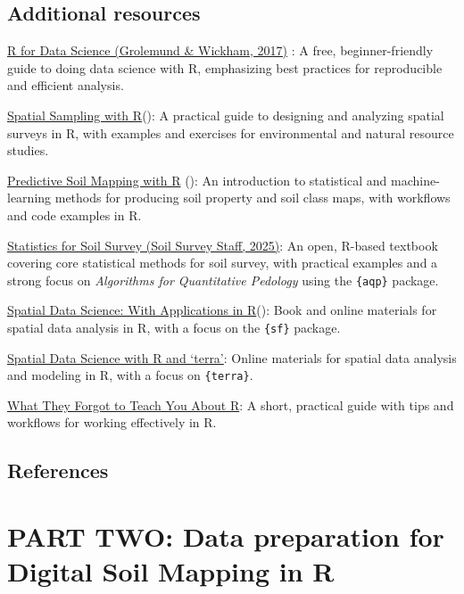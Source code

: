 \documentclass[
  10pt,
  b5paper,
  oneside]{book}
\begin{document}
\subsection{Additional resources}\label{r-resources}

\href{https://r4ds.had.co.nz/}{R for Data Science (Grolemund \& Wickham, 2017)} : A free, beginner-friendly guide to doing data science with R, emphasizing best practices for reproducible and efficient analysis.

\href{https://dickbrus.github.io/SpatialSamplingwithR/}{Spatial Sampling with R}(): A practical guide to designing and analyzing spatial surveys in R, with examples and exercises for environmental and natural resource studies.

\href{https://soilmapper.org/}{Predictive Soil Mapping with R} (): An introduction to statistical and machine-learning methods for producing soil property and soil class maps, with workflows and code examples in R.

\href{https://ncss-tech.github.io/stats_for_soil_example/}{Statistics for Soil Survey (Soil Survey Staff, 2025)}: An open, R-based textbook covering core statistical methods for soil survey, with practical examples and a strong focus on \emph{Algorithms for Quantitative Pedology} using the \texttt{\{aqp\}} package.

\href{https://rspatial.org/}{Spatial Data Science: With Applications in R}(): Book and online materials for spatial data analysis in R, with a focus on the \texttt{\{sf\}} package.

\href{https://rspatial.org/}{Spatial Data Science with R and `terra'}: Online materials for spatial data analysis and modeling in R, with a focus on \texttt{\{terra\}}.

\href{https://rstats.wtf/}{What They Forgot to Teach You About R}: A short, practical guide with tips and workflows for working effectively in R.

\subsection*{References}\label{references}

\section{PART TWO: Data preparation for Digital Soil Mapping in R}\label{part-two-data-preparation-for-digital-soil-mapping-in-r}
\end{document}
